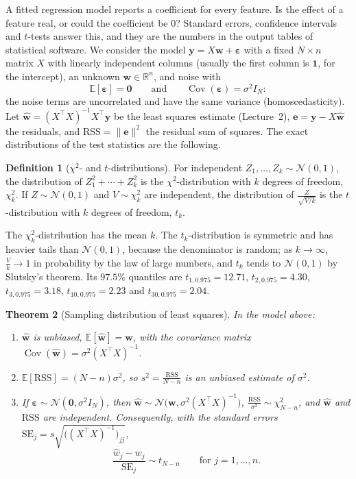 \documentclass[11pt]{article}
\newcommand{\norm}[1]{\lVert #1 \rVert}
\newcommand{\E}{\mathbb{E}}
\DeclareMathOperator{\Cov}{Cov}
\theoremstyle{definition}
\newtheorem{definition}{Definition}[section]
\theoremstyle{plain}
\newtheorem{theorem}[definition]{Theorem}
\theoremstyle{remark}
\begin{document}
A fitted regression model reports a coefficient for every feature. Is the effect of a feature real, or could the coefficient be $0$? Standard errors, confidence intervals and $t$-tests answer this, and they are the numbers in the output tables of statistical software. We consider the model $\mathbf{y} = X\mathbf{w} + \boldsymbol{\varepsilon}$ with a fixed $N \times n$ matrix $X$ with linearly independent columns (usually the first column is $\mathbf{1}$, for the intercept), an unknown $\mathbf{w} \in \mathbb{R}^n$, and noise with
\[\E[\boldsymbol{\varepsilon}] = \mathbf{0} \qquad \text{and} \qquad \Cov(\boldsymbol{\varepsilon}) = \sigma^2I_N:\]
the noise terms are uncorrelated and have the same variance (homoscedasticity). Let $\hat{\mathbf{w}} = (X^\top X)^{-1}X^\top\mathbf{y}$ be the least squares estimate (Lecture~2), $\mathbf{e} = \mathbf{y} - X\hat{\mathbf{w}}$ the residuals, and $\mathrm{RSS} = \norm{\mathbf{e}}^2$ the residual sum of squares. The exact distributions of the test statistics are the following.

\begin{definition}[$\chi^2$- and $t$-distributions]\label{def:chi2-t}
    For independent $Z_1, \ldots, Z_k \sim \mathcal{N}(0, 1)$, the distribution of $Z_1^2 + \cdots + Z_k^2$ is the $\chi^2$-distribution with $k$ degrees of freedom, $\chi^2_k$. If $Z \sim \mathcal{N}(0, 1)$ and $V \sim \chi^2_k$ are independent, the distribution of $\frac{Z}{\sqrt{V/k}}$ is the $t$-distribution with $k$ degrees of freedom, $t_k$.
\end{definition}

The $\chi^2_k$-distribution has the mean $k$. The $t_k$-distribution is symmetric and has heavier tails than $\mathcal{N}(0, 1)$, because the denominator is random; as $k \to \infty$, $\frac{V}{k} \to 1$ in probability by the law of large numbers, and $t_k$ tends to $\mathcal{N}(0, 1)$ by Slutsky's theorem. Its $97.5\%$ quantiles are $t_{1, 0.975} = 12.71$, $t_{2, 0.975} = 4.30$, $t_{3, 0.975} = 3.18$, $t_{10, 0.975} = 2.23$ and $t_{30, 0.975} = 2.04$.

\begin{theorem}[Sampling distribution of least squares]\label{thm:regression-inference}
    In the model above:
    \begin{enumerate}
        \item $\hat{\mathbf{w}}$ is unbiased, $\E[\hat{\mathbf{w}}] = \mathbf{w}$, with the covariance matrix $\Cov(\hat{\mathbf{w}}) = \sigma^2(X^\top X)^{-1}$.
        \item $\E[\mathrm{RSS}] = (N - n)\sigma^2$, so $s^2 = \frac{\mathrm{RSS}}{N - n}$ is an unbiased estimate of $\sigma^2$.
        \item If $\boldsymbol{\varepsilon} \sim \mathcal{N}(\mathbf{0}, \sigma^2I_N)$, then $\hat{\mathbf{w}} \sim \mathcal{N}\big(\mathbf{w}, \sigma^2(X^\top X)^{-1}\big)$, $\frac{\mathrm{RSS}}{\sigma^2} \sim \chi^2_{N-n}$, and $\hat{\mathbf{w}}$ and $\mathrm{RSS}$ are independent. Consequently, with the standard errors $\mathrm{SE}_j = s\sqrt{\big((X^\top X)^{-1}\big)_{jj}}$,
        \[\frac{\hat w_j - w_j}{\mathrm{SE}_j} \sim t_{N-n} \qquad \text{for } j = 1, \ldots, n.\]
    \end{enumerate}
\end{theorem}
\end{document}
